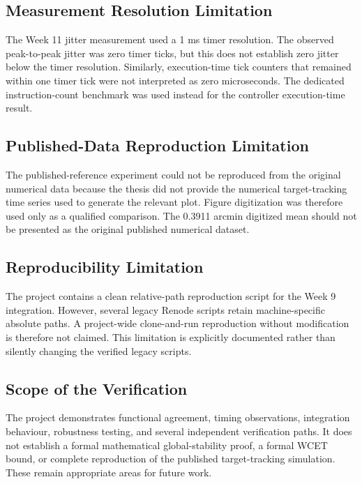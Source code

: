 \documentclass[11pt,a4paper]{article}
\begin{document}
\subsection{Measurement Resolution Limitation}

The Week 11 jitter measurement used a 1 ms timer resolution. The observed peak-to-peak jitter was zero timer ticks, but this does not establish zero jitter below the timer resolution. Similarly, execution-time tick counters that remained within one timer tick were not interpreted as zero microseconds. The dedicated instruction-count benchmark was used instead for the controller execution-time result.

\subsection{Published-Data Reproduction Limitation}

The published-reference experiment could not be reproduced from the original numerical data because the thesis did not provide the numerical target-tracking time series used to generate the relevant plot. Figure digitization was therefore used only as a qualified comparison. The 0.3911 arcmin digitized mean should not be presented as the original published numerical dataset.

\subsection{Reproducibility Limitation}

The project contains a clean relative-path reproduction script for the Week 9 integration. However, several legacy Renode scripts retain machine-specific absolute paths. A project-wide clone-and-run reproduction without modification is therefore not claimed. This limitation is explicitly documented rather than silently changing the verified legacy scripts.

\subsection{Scope of the Verification}

The project demonstrates functional agreement, timing observations, integration behaviour, robustness testing, and several independent verification paths. It does not establish a formal mathematical global-stability proof, a formal WCET bound, or complete reproduction of the published target-tracking simulation. These remain appropriate areas for future work.
\end{document}
